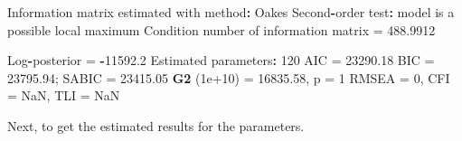\documentclass[
]{article}
\newenvironment{Shaded}{\begin{snugshade}}{\end{snugshade}}
\newcommand{\ConstantTok}[1]{\textcolor[rgb]{0.56,0.35,0.01}{#1}}
\newcommand{\DecValTok}[1]{\textcolor[rgb]{0.00,0.00,0.81}{#1}}
\newcommand{\FloatTok}[1]{\textcolor[rgb]{0.00,0.00,0.81}{#1}}
\newcommand{\FunctionTok}[1]{\textcolor[rgb]{0.13,0.29,0.53}{\textbf{#1}}}
\newcommand{\NormalTok}[1]{#1}
\newcommand{\OtherTok}[1]{\textcolor[rgb]{0.56,0.35,0.01}{#1}}
\newcommand{\SpecialCharTok}[1]{\textcolor[rgb]{0.81,0.36,0.00}{\textbf{#1}}}
\begin{document}
\begin{Shaded}
\begin{Highlighting}[]
\NormalTok{Information matrix estimated with method}\SpecialCharTok{:}\NormalTok{ Oakes}
\NormalTok{Second}\SpecialCharTok{{-}}\NormalTok{order test}\SpecialCharTok{:}\NormalTok{ model is a possible local maximum}
\NormalTok{Condition number of information matrix }\OtherTok{=}  \FloatTok{488.9912}

\NormalTok{Log}\SpecialCharTok{{-}}\NormalTok{posterior }\OtherTok{=} \SpecialCharTok{{-}}\FloatTok{11592.2}
\NormalTok{Estimated parameters}\SpecialCharTok{:} \DecValTok{120} 
\NormalTok{AIC }\OtherTok{=} \FloatTok{23290.18}
\NormalTok{BIC }\OtherTok{=} \FloatTok{23795.94}\NormalTok{; SABIC }\OtherTok{=} \FloatTok{23415.05}
\FunctionTok{G2}\NormalTok{ (}\FloatTok{1e+10}\NormalTok{) }\OtherTok{=} \FloatTok{16835.58}\NormalTok{, p }\OtherTok{=} \DecValTok{1}
\NormalTok{RMSEA }\OtherTok{=} \DecValTok{0}\NormalTok{, CFI }\OtherTok{=} \ConstantTok{NaN}\NormalTok{, TLI }\OtherTok{=} \ConstantTok{NaN}
\end{Highlighting}
\end{Shaded}

Next, to get the estimated results for the parameters.
\end{document}
